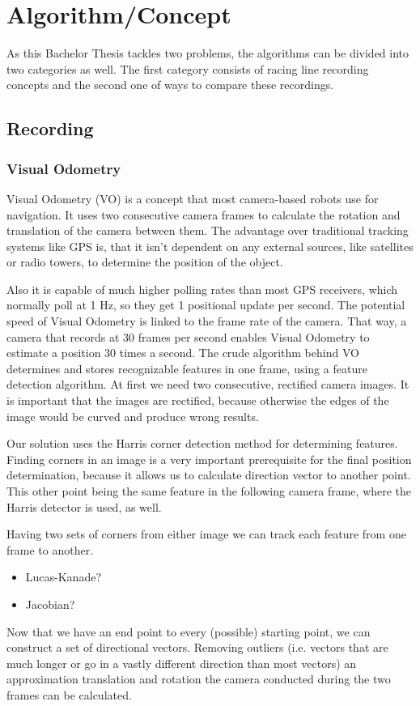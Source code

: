\section{Algorithm/Concept}
\label{sec:algorithm}
\graphicspath{{utils/}}
As this Bachelor Thesis tackles two problems, the algorithms can be divided into two categories as well.
The first category consists of racing line recording concepts and the second one of ways to compare these recordings.

\subsection{Recording}
\subsubsection{Visual Odometry}
Visual Odometry (VO) is a concept that most camera-based robots use for navigation. It uses two consecutive camera frames to calculate the rotation and translation of the camera between them. The advantage over traditional tracking systems like GPS is, that it isn't dependent on any external sources, like satellites or radio towers, to determine the position of the object.

Also it is capable of much higher polling rates than most GPS receivers, which normally poll at 1 Hz, so they get 1 positional update per second. The potential speed of Visual Odometry is linked to the frame rate of the camera. That way, a camera that records at 30 frames per second enables Visual Odometry to estimate a position 30 times a second. 
The crude algorithm behind VO determines and stores recognizable features in one frame, using a feature detection algorithm.
At first we need two consecutive, rectified camera images. It is important that the images are rectified, because otherwise the edges of the image would be curved and produce wrong results.

Our solution uses the Harris corner detection method for determining features. Finding corners in an image is a very important prerequisite for the final position determination, because it allows us to calculate direction vector to another point. This other point being the same feature in the following camera frame, where the Harris detector is used, as well.

Having two sets of corners from either image we can track each feature from one frame to another. 
\begin{itemize}
    \item Lucas-Kanade?
    \item Jacobian?
\end{itemize}
Now that we have an end point to every (possible) starting point, we can construct a set of directional vectors.
Removing outliers (i.e. vectors that are much longer or go in a vastly different direction than most vectors) an approximation translation and rotation the camera conducted during the two frames can be calculated.

